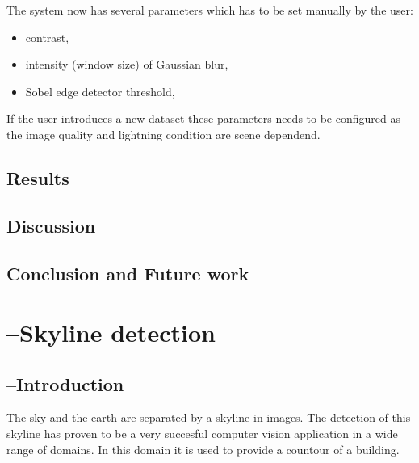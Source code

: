 \documentclass[10pt]{article}
\begin{document}

The system now has several parameters which has to be set manually by the user:
\begin{itemize}
	\item contrast,
	\item intensity (window size) of Gaussian blur,
	\item Sobel edge detector threshold,
\end{itemize}

If the user introduces a new dataset these parameters needs to be configured
as the image quality and lightning condition are scene dependend.


\subsection{Results}%

\subsection{Discussion}  %
\subsection{Conclusion and Future work}





\section{--Skyline detection}
 \subsection{--Introduction}

The sky and the earth are separated by a skyline in images. The detection of this skyline
has proven to be a very succesful computer vision application in a wide range of
domains. In this domain it is used to provide a countour of a building. 
\end{document}
